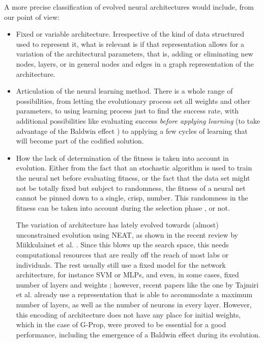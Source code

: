 \documentclass[runningheads]{llncs}
\begin{document}
A more precise classification of evolved neural architectures would include, from our point of
view: \begin{itemize}
  \item Fixed or variable architecture. Irrespective of the kind of
    data structured used to represent it, what is relevant is if that
    representation allows for a variation of the architectural
    parameters, that is, adding or eliminating new nodes, layers, or
    in general nodes and edges in a graph representation of the
    architecture.
  \item Articulation of the neural learning method. There is a whole
    range of possibilities, from letting the evolutionary process set
    all weights and other parameters, to using learning process just
    to find the success rate, with additional possibilities like
    evaluating success {\em before applying learning} (to take
    advantage of the Baldwin effect \cite{castillo-2006}) to applying
    a few cycles of learning that will become part of the codified
    solution.
  \item How the lack of determination of the fitness is taken into account
    in evolution. Either from the fact that an stochastic algorithm is
    used to train the neural net before evaluating fitness, or the
    fact that the data set might not be totally fixed but subject to
    randomness, the fitness of a neural net cannot be pinned down to a
    single, crisp, number. This randomness in the fitness can be taken
    into account during the selection phase
    \cite{DBLP:conf/ijcci/MereloLFGCCRMG15}, or not.


The variation of architecture has lately evolved towards (almost)
unconstrained evolution using NEAT, as shown in the recent review by
Miikkulainet et al. \cite{miikkulainen2019evolving}. Since this blows
up the search space, this needs computational resources that are
really off the reach of most labs or individuals. The rest usually
still use a fixed model for the network architecture, for instance SVM
or MLPs, and even, in some cases, fixed number of layers and weights
\cite{ecer2020training}; however, recent papers like the one by
Tajmiri et al. \cite{TAJMIRI2020108997} already use a representation
that is able to accommodate a maximum number of layers, as well as the
number of neurons in every layer. However, this encoding of
architecture does not have any place for initial weights, which in the
case of G-Prop, were proved to be essential for a good performance,
including the emergence of a Baldwin effect \cite{castillo-2006}
during its evolution.


\end{itemize}
\end{document}
